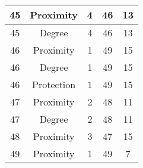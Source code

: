 \documentclass[results.tex]{subfiles}
\begin{document}
\begin{center}
\begin{tabular}{| c || c | c | c | c |}
            \hline
            45                      & Proximity                    & 4                      & 46                      & 13                   \\
            \hline
            45                      & Degree                       & 4                      & 46                      & 13                   \\
            \hline
            46                      & Proximity                    & 1                      & 49                      & 15                   \\
            \hline
            46                      & Degree                       & 1                      & 49                      & 15                   \\
            \hline
            46                      & Protection                   & 1                      & 49                      & 15                   \\
            \hline
            47                      & Proximity                    & 2                      & 48                      & 11                   \\
            \hline
            47                      & Degree                       & 2                      & 48                      & 11                   \\
            \hline
            48                      & Proximity                    & 3                      & 47                      & 15                   \\
            \hline
            49                      & Proximity                    & 1                      & 49                      & 7                    \\
            \hline
        \end{tabular}
    \end{center}
\end{document}
